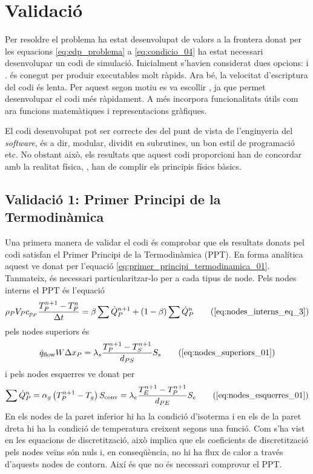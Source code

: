 
\section{Validació}

Per resoldre el problema ha estat desenvolupat de valors a la frontera donat per les equacions \eqref{eq:edp_problema} a \eqref{eq:condicio_04} ha estat necessari desenvolupar un codi de simulació. Inicialment s'havien considerat dues opcions: \CC i \MATLAB. \CC és conegut per produir executables molt ràpids. Ara bé, la velocitat d'escriptura del codi és lenta. Per aquest segon motiu es va escollir \MATLAB, ja que permet desenvolupar el codi més ràpidament. A més incorpora funcionalitats útils com ara funcions matemàtiques i representacions gràfiques.

El codi desenvolupat pot ser correcte des del punt de vista de l'enginyeria del \emph{software}, és a dir, modular, dividit en subrutines, un bon estil de programació etc. No obstant això, els resultats que aquest codi proporcioni han de concordar amb la realitat física, \ie, han de complir els principis físics bàsics.

\subsection{Validació 1: Primer Principi de la Termodinàmica}

Una primera manera de validar el codi és comprobar que els resultats donats pel codi satisfan el Primer Principi de la Termodinàmica (PPT). En forma analítica aquest ve donat per l'equació \eqref{eq:primer_principi_termodinamica_01}. Tanmateix, és necessari particularitzar-lo per a cada tipus de node. Pels nodes interns el PPT és l'equació
\begin{equation}
	\rho_P V_P c_{p_P} \frac{T_P^{n+1} - T_P^n}{\Delta t} = 
	\beta \sum \dot{Q}_P^{n+1} + (1 - \beta) \sum \dot{Q}_P^n	
	\tag{\ref{eq:nodes_interns_eq_3}}
\end{equation}
pels nodes superiors és
\begin{equation} 
	\dot{q}_\text{flow} W \Delta x_P = 
	\lambda_s \frac{T_P^{n+1} - T_S^{n+1}}{d_{PS}} S_s
	\tag{\ref{eq:nodes_superiors_01}}
\end{equation}
i pels nodes esquerres ve donat per
\begin{equation}
	\sum \dot{Q}_P^n =
	\alpha_g \left( T_P^{n+1} - T_g \right) S_\text{conv} = 
	\lambda_e \frac{T_E^{n+1} - T_P^{n+1}}{d_{PE}} S_e
	\tag{\ref{eq:nodes_esquerres_01}}
\end{equation}
En els nodes de la paret inferior hi ha la condició d'isoterma i en els de la paret dreta hi ha la condició de temperatura creixent segons una funció. Com s'ha vist en les equacions de discretització, això implica que els coeficients de discretització pels nodes veïns són nuls i, en conseqüència, no hi ha flux de calor a través d'aquests nodes de contorn. Així és que no és necessari comprovar el PPT.

